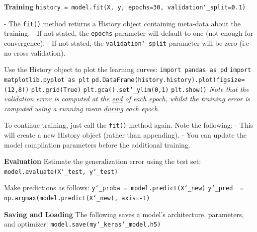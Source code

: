 \textbf{Training}\newline
\texttt{history = model.fit(X, y, epochs=30, validation\char`_split=0.1)}

- The \texttt{fit()} method returns a History object containing meta-data about the training.\newline
- If not stated, the \texttt{epochs} parameter will default to one (not enough for convergence).\newline
- If not stated, the \texttt{validation\char`_split} parameter will be zero (i.e no cross validation).

Use the History object to plot the learning curves:\newline
\texttt{import pandas as pd}\newline
\texttt{import matplotlib.pyplot as plt}\newline
\texttt{pd.DataFrame(history.history).plot(figsize=(12,8))}\newline
\texttt{plt.grid(True)}\newline
\texttt{plt.gca().set\char`_ylim(0,1)}\newline
\texttt{plt.show()}\newline
\textit{Note that the validation error is computed at the \underline{end} of each epoch,
whilst the training error is computed using a running mean \underline{during} each epoch.}

To continue training, just call the \texttt{fit()} method again. Note the following:\newline
- This will create a new History object (rather than appending).\newline
- You can update the model compilation parameters before the additional training.\newline

\textbf{Evaluation}\newline
Estimate the generalization error using the test set:\newline
\texttt{model.evaluate(X\char`_test, y\char`_test)}

Make predictions as follows:\newline
\texttt{y\char`_proba = model.predict(X\char`_new)}\newline
\texttt{y\char`_pred ~= np.argmax(model.predict(X\char`_new), axis=-1)}\newline

\textbf{Saving and Loading}\newline
The following saves a model's architecture, parameters, and optimizer:\newline
\texttt{model.save(\textquotesingle my\char`_keras\char`_model.h5\textquotesingle)}

